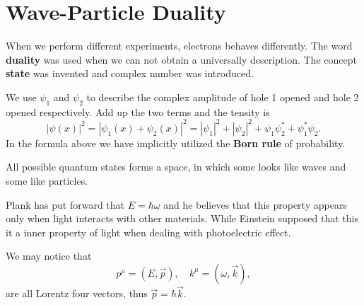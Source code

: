 
\chapter[波粒二象性]{Wave-Particle Duality}
When we perform different experiments, electrons behaves differently. The word \textbf{duality} was used when we can not obtain a universally description. The concept \textbf{state} was invented and complex number was introduced. 

We use $\psi_1$ and $\psi_2$ to describe the complex amplitude of hole 1 opened and hole 2 opened respectively. Add up the two terms and the tensity is
\begin{equation}
  \left| \psi(x) \right| ^{2} = \left| \psi_1(x) + \psi_2(x) \right| ^{2} = \left| \psi_1 \right| ^{2} + \left| \psi_2 \right| ^{2} + \psi_1 \psi_2^{*} + \psi_1^{*}\psi_2.
\end{equation}
In the formula above we have implicitly utilized the \textbf{Born rule} of probability.

All possible quantum states forms a space, in which some looks like waves and some like particles.

Plank has put forward that $E = \hbar \omega$ and he believes that this property appears only when light interacts with other materials.
While Einstein supposed that this it a inner property of light when dealing with photoelectric effect.

We may notice that 
\begin{equation}
  p^{\mu} = (E, \vec{p}), \quad k^{\mu} = (\omega, \vec{k}),
\end{equation}
are all Lorentz four vectors, thus $\vec{p} = \hbar \vec{k}$.

